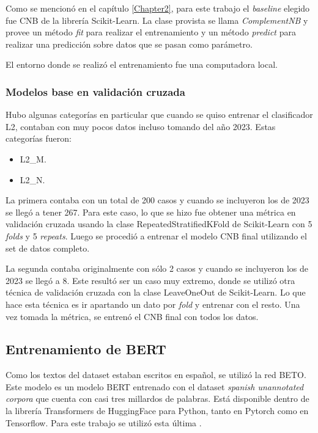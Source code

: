 Como se mencionó en el capítulo \ref{Chapter2}, para este trabajo el \textit{baseline} elegido fue CNB de la librería Scikit-Learn. La clase provista se llama \textit{ComplementNB} y provee un método \textit{fit} para realizar el entrenamiento y un método \textit{predict} para realizar una predicción sobre datos que se pasan como parámetro.

El entorno donde se realizó el entrenamiento fue una computadora local.

\subsubsection{Modelos base en validación cruzada}
\label{sec:kfolds}

Hubo algunas categorías en particular que cuando se quiso entrenar el clasificador L2, contaban con muy pocos datos incluso tomando del año 2023. Estas categorías fueron:
\begin{itemize}
	\item L2\_M.
	\item L2\_N.
\end{itemize}

La primera contaba con un total de 200 casos y cuando se incluyeron los de 2023  se llegó a tener 267. Para este caso, lo que se hizo fue obtener una métrica en validación cruzada usando la clase RepeatedStratifiedKFold de Scikit-Learn con 5 \textit{folds} y 5 \textit{repeats}. Luego se procedió a entrenar el modelo CNB final utilizando el set de datos completo.

La segunda contaba originalmente con sólo 2 casos y cuando se incluyeron los de 2023 se llegó a 8. Este resultó ser un caso muy extremo, donde se utilizó otra técnica de validación cruzada con la clase LeaveOneOut de Scikit-Learn. Lo que hace esta técnica es ir apartando un dato por \textit{fold} y entrenar con el resto. Una vez tomada la métrica, se entrenó el CNB final con todos los datos.

\subsection{Entrenamiento de BERT}

Como los textos del dataset estaban escritos en español, se utilizó la red BETO. Este modelo es un modelo BERT entrenado con el dataset \textit{spanish unannotated corpora} que cuenta con casi tres millardos de palabras. Está disponible dentro de la librería Transformers de HuggingFace para Python, tanto en Pytorch como en Tensorflow. Para este trabajo se utilizó esta última \citep{WEBSITE:38}.


